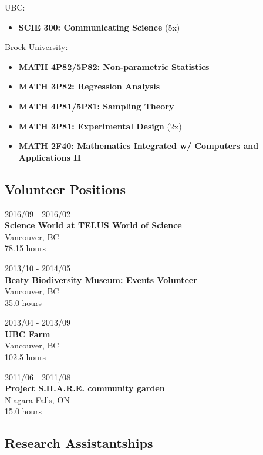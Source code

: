 \documentclass[]{article}
\providecommand{\tightlist}{%
  \setlength{\itemsep}{0pt}\setlength{\parskip}{0pt}}
\begin{document}
UBC:

\begin{itemize}
\tightlist
\item
  \textbf{SCIE 300: Communicating Science} (5x)
\end{itemize}

Brock University:

\begin{itemize}
\tightlist
\item
  \textbf{MATH 4P82/5P82: Non-parametric Statistics}
\item
  \textbf{MATH 3P82: Regression Analysis}
\item
  \textbf{MATH 4P81/5P81: Sampling Theory}
\item
  \textbf{MATH 3P81: Experimental Design} (2x)
\item
  \textbf{MATH 2F40: Mathematics Integrated w/ Computers and Applications II}
\end{itemize}

\hypertarget{volunteer-positions}{%
\subsection{Volunteer Positions}\label{volunteer-positions}}

2016/09 - 2016/02\\
\textbf{Science World at TELUS World of Science }\\
Vancouver, BC\\
78.15 hours

2013/10 - 2014/05\\
\textbf{Beaty Biodiversity Museum: Events Volunteer}\\
Vancouver, BC\\
35.0 hours

2013/04 - 2013/09\\
\textbf{UBC Farm}\\
Vancouver, BC\\
102.5 hours

2011/06 - 2011/08\\
\textbf{Project S.H.A.R.E. community garden}\\
Niagara Falls, ON\\
15.0 hours

\hypertarget{research-assistantships}{%
\subsection{Research Assistantships}\label{research-assistantships}}
\end{document}
